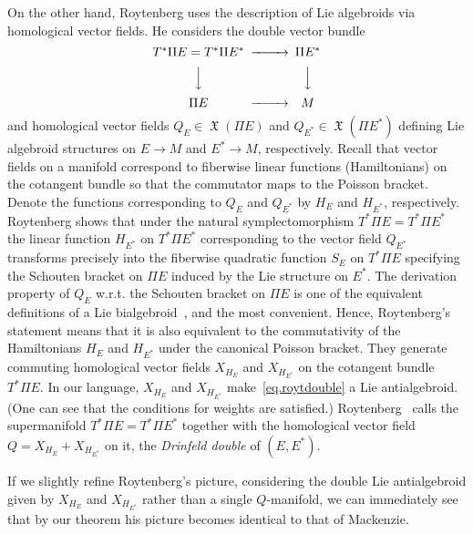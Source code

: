 \documentclass[12pt,reqno,a4paper]{amsart}
\theoremstyle{definition}
\begin{document}
On the other hand, Roytenberg uses the description of Lie algebroids
via homological vector fields. He considers the double vector bundle
\begin{equation} \label{eq.roytdouble}
    \begin{CD} T^*\Pi E=T^*\Pi E^*@>>>   \Pi E^*\\
                @VVV  @VVV \\
               \Pi E@>>>M
    \end{CD}
\end{equation}
and   homological vector fields  $Q_E\in\operatorname{\mathfrak{X}} (\Pi E)$ and
$Q_{E^*}\in\operatorname{\mathfrak{X}} (\Pi E^*)$ defining Lie algebroid structures on
$E\to M$ and $E^*\to M$, respectively. Recall that  vector fields on
a manifold correspond to fiberwise linear functions (Hamiltonians)
on the cotangent bundle so that the commutator  maps to the Poisson
bracket. Denote the functions corresponding to $Q_E$ and $Q_{E^*}$
by $H_E$ and $H_{E^*}$, respectively. Roytenberg shows that under
the natural symplectomorphism $T^*\Pi E=T^*\Pi E^*$ the linear
function $H_{E^*}$ on $T^*\Pi E^*$ corresponding to the vector field
$Q_{E^*}$ transforms precisely into the fiberwise quadratic function
$S_E$ on $T^*\Pi E$  specifying the Schouten bracket on $\Pi E$
induced by the Lie structure on $E^*$. The derivation property of
$Q_E$ w.r.t. the Schouten bracket on $\Pi E$ is one of the
equivalent definitions of a Lie bialgebroid~\cite{yvette:exact}, and
the most convenient. Hence, Roytenberg's statement means that it is
also equivalent to the commutativity of the Hamiltonians $H_E$ and
$H_{E^*}$ under the canonical Poisson bracket. They generate
commuting homological vector fields $X_{H_E}$ and $X_{H_{E^*}}$ on
the cotangent bundle $T^*\Pi E$. In our language, $X_{H_E}$ and
$X_{H_{E^*}}$ make~\eqref{eq.roytdouble} a Lie antialgebroid. (One
can see that the conditions for weights are satisfied.)
Roytenberg~\cite{roytenberg:thesis} calls the supermanifold $T^*\Pi
E=T^*\Pi E^*$ together with the homological vector field
$Q=X_{H_E}+X_{H_{E^*}}$ on it, the \textit{Drinfeld double} of
$(E,E^*)$.

If we slightly refine Roytenberg's picture,  considering the double
Lie antialgebroid given by $X_{H_E}$ and $X_{H_{E^*}}$ rather than a
single $Q$-manifold, we can immediately see that by our
theorem  his picture becomes identical to that of
Mackenzie.
\end{document}
